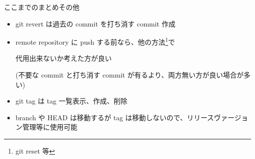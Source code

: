 
\begin{frame}[t]{ここまでのまとめ}{その他}

  \begin{itemize}
  \item git revert は過去の commit を打ち消す commit 作成
    \vspace{2ex}

  \item remote repository に push する前なら、他の方法\footnote{git reset 等}で

    代用出来ないか考えた方が良い

    (不要な commit と打ち消す commit が有るより、両方無い方が良い場合が多い)
    \vspace{2ex}

  \item git tag は tag 一覧表示、作成、削除
    \vspace{2ex}

  \item branch や HEAD は移動するが tag は移動しないので、リリースヴァージョン管理等に使用可能
  \end{itemize}

\end{frame}
